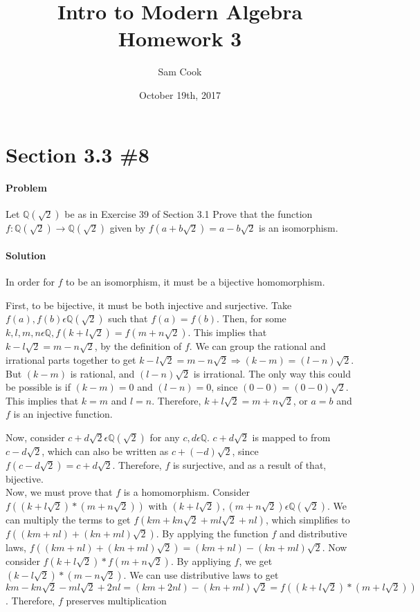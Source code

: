 \documentclass[a4paper,11pt]{article}
\author{Sam Cook}
\title{Intro to Modern Algebra \\Homework 3}
\date{October 19th, 2017}
\begin{document}
\maketitle
\section{Section 3.3 \#8}
\paragraph{Problem}
Let $\mathbb{Q}(\sqrt{2})$ be as in Exercise 39 of Section 3.1 Prove that the function $f:\mathbb{Q}(\sqrt{2})  \rightarrow \mathbb{Q}(\sqrt{2})$
given by $f(a + b\sqrt{2}) = a - b\sqrt{2}$ is an isomorphism.
\paragraph{Solution}

In order for $f$ to be an isomorphism, it must be a bijective homomorphism.

First, to be bijective, it must be both injective and surjective.
Take $f(a), f(b) \epsilon \mathbb{Q}(\sqrt{2})$ such that $f(a) = f(b)$. Then, for some $k,l,m,n \epsilon \mathbb{Q}, f(k+l\sqrt{2}) = f(m + n\sqrt{2})$. This implies that $k-l\sqrt{2} = m - n\sqrt{2}$, by the definition of $f$. We can group the rational and irrational parts together to get $k-l\sqrt{2} = m - n\sqrt{2} \Rightarrow (k-m) = (l-n)\sqrt{2}$. But $(k-m)$ is rational, and $(l-n)\sqrt{2}$ is irrational. The only way this could be possible is if $(k-m)=0$ and $(l-n)=0$, since $(0-0) = (0-0)\sqrt{2}$. This implies that $k=m$ and $l=n$. Therefore, $k+l\sqrt{2} = m + n\sqrt{2}$, or $a=b$ and $f$ is an injective function.

Now, consider $c + d\sqrt{2}  \epsilon \mathbb{Q}(\sqrt{2})$ for any $c,d \epsilon \mathbb{Q}$. $c + d\sqrt{2}$ is mapped to from $c - d\sqrt{2}$, which can also be written as $c + (-d)\sqrt{2}$, since $f(c - d\sqrt{2}) = c + d\sqrt{2}$. Therefore, $f$ is surjective, and as a result of that, bijective.\\

Now, we must prove that $f$ is a homomorphism.
Consider  $f((k+l\sqrt{2}) * (m + n\sqrt{2}))$ with $(k+l\sqrt{2}), (m + n\sqrt{2}) \epsilon \mathbb{Q}(\sqrt{2})$. We can multiply the terms to get $f(km + kn\sqrt{2} + ml\sqrt{2} + nl)$, which simplifies to $f((km + nl) + (kn + ml)\sqrt{2})$. By applying the function $f$ and distributive laws,  $f((km + nl) + (kn + ml)\sqrt{2}) = (km + nl) - (kn + ml)\sqrt{2}$. Now consider $f(k+l\sqrt{2}) * f(m+n\sqrt{2})$. By appliying $f$, we get $(k -l\sqrt{2}) * (m - n\sqrt{2})$. We  can use distributive laws to get $km - kn\sqrt{2} - ml\sqrt{2} +2nl = (km + 2nl) - (kn + ml)\sqrt{2} = f((k+l\sqrt{2}) * (m + l\sqrt{2}))$. Therefore, $f$ preserves multiplication
\end{document}

